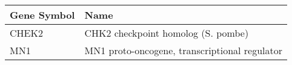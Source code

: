 \begin{tabular}{ll}
\toprule
Gene Symbol &                                          Name \\
\midrule
      CHEK2 &            CHK2 checkpoint homolog (S. pombe) \\
        MN1 & MN1 proto-oncogene, transcriptional regulator \\
\bottomrule
\end{tabular}
